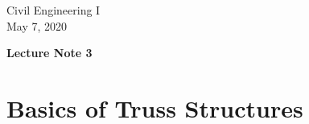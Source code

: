 ﻿\documentclass[10pt,a4j]{article}
\newlength{\minitwocolumn}
\begin{document}
\newcommand{\fat}[1]{\mbox{\boldmath $#1$}}
\newcommand{\D}{\partial}
\newcommand{\w}{\omega}
\newcommand{\ga}{\alpha}
\newcommand{\gb}{\beta}
\newcommand{\gx}{\xi}
\newcommand{\gz}{\zeta}
\newcommand{\vhat}[1]{\hat{\fat{#1}}}
\newcommand{\spc}{\vspace{0.7\baselineskip}}
\newcommand{\halfspc}{\vspace{0.3\baselineskip}}

\newcommand{\twofig}[2]
 {
   \begin{figure}
     \begin{minipage}[t]{\minitwocolumn}
         \begin{center}   #1
         \end{center}
     \end{minipage}
         \hspace{\columnsep}
     \begin{minipage}[t]{\minitwocolumn}
         \begin{center} #2
         \end{center}
     \end{minipage}
   \end{figure}
 }
\begin{flushright}
	Civil Engineering I \\
	May 7, 2020
\end{flushright}
\begin{center}
	{\Large \bf Lecture Note 3 }
\end{center}
\setcounter{section}{2}
\section{Basics of Truss Structures}
\end{document}
